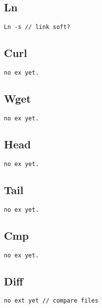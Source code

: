\subsection{Ln}

\begin{verbatim}
Ln -s // link soft?
\end{verbatim}

\subsection{Curl}

\begin{verbatim}
no ex yet.
\end{verbatim}

\subsection{Wget}

\begin{verbatim}
no ex yet.
\end{verbatim}

\subsection{Head}

\begin{verbatim}
no ex yet.
\end{verbatim}

\subsection{Tail}

\begin{verbatim}
no ex yet.
\end{verbatim}

\subsection{Cmp}

\begin{verbatim}
no ex yet.
\end{verbatim}

\subsection{Diff}

\begin{verbatim}
no ext yet // compare files
\end{verbatim}

